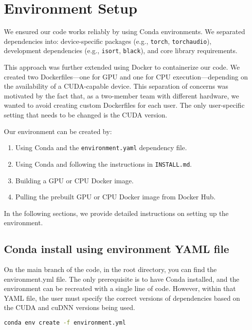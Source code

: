 \chapter{Environment Setup}
\label{ch:env_setup}

We ensured our code works reliably by using Conda environments. We separated dependencies into:
device-specific packages (e.g., \texttt{torch}, \texttt{torchaudio}), development dependencies (e.g., \texttt{isort}, \texttt{black}), and core library requirements.

This approach was further extended using Docker to containerize our code. We created two Dockerfiles—one for GPU and one for CPU execution—depending on the availability of a CUDA-capable device. This separation of concerns was motivated by the fact that, as a two-member team with different hardware, we wanted to avoid creating custom Dockerfiles for each user. The only user-specific setting that needs to be changed is the CUDA version.

Our environment can be created by:
\begin{enumerate}
    \item Using Conda and the \texttt{environment.yaml} dependency file.
    \item Using Conda and following the instructions in \texttt{INSTALL.md}.
    \item Building a GPU or CPU Docker image.
    \item Pulling the prebuilt GPU or CPU Docker image from Docker Hub.
\end{enumerate}

In the following sections, we provide detailed instructions on setting up the environment.

\section{Conda install using environment YAML file} 

On the main branch of the code, in the root directory, you can find the environment.yml file. The only prerequisite is to have Conda installed, and the environment can be recreated with a single line of code. However, within that YAML file, the user must specify the correct versions of dependencies based on the CUDA and cuDNN versions being used.

\begin{lstlisting}[language=bash, caption={Creating Conda environment from \texttt{environment.yml}}, label=list:create_conda_env]
           conda env create -f environment.yml
\end{lstlisting}

